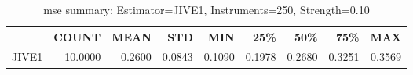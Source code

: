 \begin{table}[ht]
\centering
\caption{mse summary: Estimator=JIVE1, Instruments=250, Strength=0.10}
\begin{tabular}{lrrrrrrrr}
\toprule
 & COUNT & MEAN & STD & MIN & 25\% & 50\% & 75\% & MAX \\
\midrule
JIVE1 & 10.0000 & 0.2600 & 0.0843 & 0.1090 & 0.1978 & 0.2680 & 0.3251 & 0.3569 \\
\bottomrule
\end{tabular}
\end{table}
